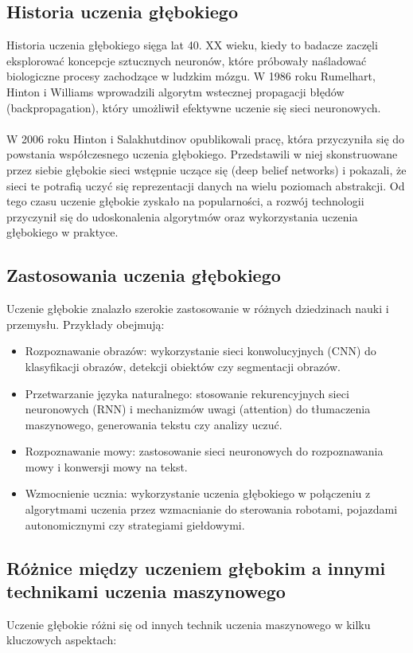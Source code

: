 \subsection{Historia uczenia głębokiego}
Historia uczenia głębokiego sięga lat 40. XX wieku, kiedy to badacze zaczęli eksplorować koncepcje sztucznych neuronów, które próbowały naśladować biologiczne procesy zachodzące w ludzkim mózgu. W 1986 roku Rumelhart, Hinton i Williams wprowadzili algorytm wstecznej propagacji błędów (backpropagation), który umożliwił efektywne uczenie się sieci neuronowych.
\paragraph{}
W 2006 roku Hinton i Salakhutdinov opublikowali pracę, która przyczyniła się do powstania współczesnego uczenia głębokiego. Przedstawili w niej skonstruowane przez siebie głębokie sieci wstępnie uczące się (deep belief networks) i pokazali, że sieci te potrafią uczyć się reprezentacji danych na wielu poziomach abstrakcji. Od tego czasu uczenie głębokie zyskało na popularności, a rozwój technologii przyczynił się do udoskonalenia algorytmów oraz wykorzystania uczenia głębokiego w praktyce.

\subsection{Zastosowania uczenia głębokiego}
Uczenie głębokie znalazło szerokie zastosowanie w różnych dziedzinach nauki i przemysłu. Przykłady obejmują:
\begin{itemize}
\item Rozpoznawanie obrazów: wykorzystanie sieci konwolucyjnych (CNN) do klasyfikacji obrazów, detekcji obiektów czy segmentacji obrazów.
\item Przetwarzanie języka naturalnego: stosowanie rekurencyjnych sieci neuronowych (RNN) i mechanizmów uwagi (attention) do tłumaczenia maszynowego, generowania tekstu czy analizy uczuć.
\item Rozpoznawanie mowy: zastosowanie sieci neuronowych do rozpoznawania mowy i konwersji mowy na tekst.
\item Wzmocnienie ucznia: wykorzystanie uczenia głębokiego w połączeniu z algorytmami uczenia przez wzmacnianie do sterowania robotami, pojazdami autonomicznymi czy strategiami giełdowymi.
\end{itemize}

\subsection{Różnice między uczeniem głębokim a innymi technikami uczenia maszynowego}
Uczenie głębokie różni się od innych technik uczenia maszynowego w kilku kluczowych aspektach:

